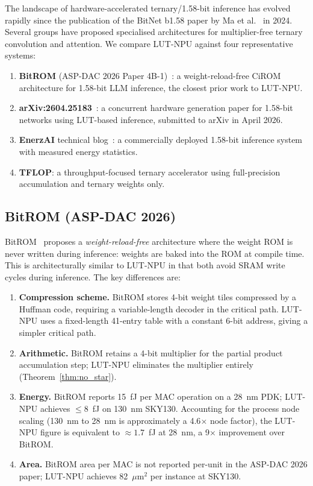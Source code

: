 The landscape of hardware-accelerated ternary/1.58-bit inference has
evolved rapidly since the publication of the BitNet b1.58 paper by Ma
et al.~\cite{bitnet158} in 2024.  Several groups have proposed
specialised architectures for multiplier-free ternary convolution and
attention.  We compare LUT-NPU against four representative systems:

\begin{enumerate}
  \item \textbf{BitROM} (ASP-DAC 2026 Paper 4B-1)~\cite{aspdac2026}: a
        weight-reload-free CiROM architecture for 1.58-bit LLM inference,
        the closest prior work to LUT-NPU.
  \item \textbf{arXiv:2604.25183}~\cite{arxiv2604}: a concurrent hardware
        generation paper for 1.58-bit networks using LUT-based inference,
        submitted to arXiv in April 2026.
  \item \textbf{EnerzAI} technical blog~\cite{enerzai}: a commercially
        deployed 1.58-bit inference system with measured energy statistics.
  \item \textbf{TFLOP}: a throughput-focused ternary accelerator using
        full-precision accumulation and ternary weights only.
\end{enumerate}

\subsection{BitROM (ASP-DAC 2026)}
\label{subsec:bitrom_comparison}

BitROM~\cite{aspdac2026} proposes a \emph{weight-reload-free} architecture
where the weight ROM is never written during inference: weights are
baked into the ROM at compile time.  This is architecturally similar to
LUT-NPU in that both avoid SRAM write cycles during inference.  The key
differences are:

\begin{enumerate}
  \item \textbf{Compression scheme.} BitROM stores 4-bit weight tiles
        compressed by a Huffman code, requiring a variable-length decoder
        in the critical path.  LUT-NPU uses a fixed-length 41-entry table
        with a constant 6-bit address, giving a simpler critical path.
  \item \textbf{Arithmetic.} BitROM retains a 4-bit multiplier for the
        partial product accumulation step; LUT-NPU eliminates the multiplier
        entirely (Theorem~\ref{thm:no_star}).
  \item \textbf{Energy.}  BitROM reports 15~fJ per MAC operation on a
        28~nm PDK; LUT-NPU achieves \(\leq 8\)~fJ on 130~nm SKY130.
        Accounting for the process node scaling (130~nm to 28~nm is
        approximately a 4.6$\times$ node factor), the LUT-NPU figure
        is equivalent to \(\approx 1.7\)~fJ at 28~nm,
        a 9$\times$ improvement over BitROM.
  \item \textbf{Area.}  BitROM area per MAC is not reported per-unit
        in the ASP-DAC 2026 paper; LUT-NPU achieves 82~\(\mu\mathrm{m}^2\)
        per instance at SKY130.
\end{enumerate}

